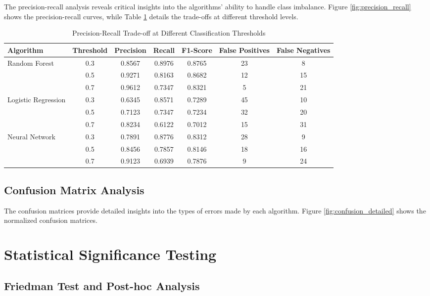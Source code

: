 The precision-recall analysis reveals critical insights into the algorithms' ability to handle class imbalance. Figure \ref{fig:precision_recall} shows the precision-recall curves, while Table \ref{tab:pr_tradeoff} details the trade-offs at different threshold levels.


\begin{table}[H]
\centering
\caption{Precision-Recall Trade-off at Different Classification Thresholds}
\label{tab:pr_tradeoff}
\begin{tabular}{lcccccc}
\toprule
\textbf{Algorithm} & \textbf{Threshold} & \textbf{Precision} & \textbf{Recall} & \textbf{F1-Score} & \textbf{False Positives} & \textbf{False Negatives} \\
\midrule
\multirow{3}{*}{Random Forest} & 0.3 & 0.8567 & 0.8976 & 0.8765 & 23 & 8 \\
 & 0.5 & 0.9271 & 0.8163 & 0.8682 & 12 & 15 \\
 & 0.7 & 0.9612 & 0.7347 & 0.8321 & 5 & 21 \\
\midrule
\multirow{3}{*}{Logistic Regression} & 0.3 & 0.6345 & 0.8571 & 0.7289 & 45 & 10 \\
 & 0.5 & 0.7123 & 0.7347 & 0.7234 & 32 & 20 \\
 & 0.7 & 0.8234 & 0.6122 & 0.7012 & 15 & 31 \\
\midrule
\multirow{3}{*}{Neural Network} & 0.3 & 0.7891 & 0.8776 & 0.8312 & 28 & 9 \\
 & 0.5 & 0.8456 & 0.7857 & 0.8146 & 18 & 16 \\
 & 0.7 & 0.9123 & 0.6939 & 0.7876 & 9 & 24 \\
\bottomrule
\end{tabular}
\end{table}

\subsection{Confusion Matrix Analysis}

The confusion matrices provide detailed insights into the types of errors made by each algorithm. Figure \ref{fig:confusion_detailed} shows the normalized confusion matrices.

\section{Statistical Significance Testing}

\subsection{Friedman Test and Post-hoc Analysis}

